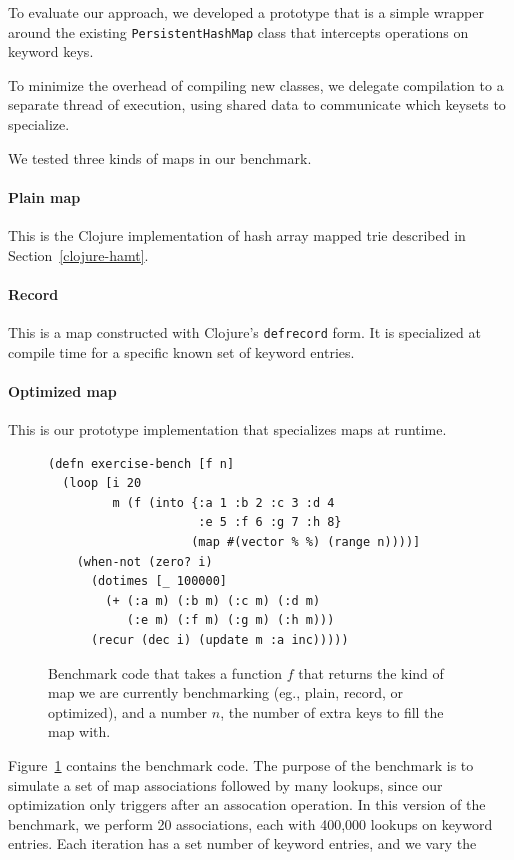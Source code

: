\documentclass[preprint]{sigplanconf}
\begin{document}
To evaluate our approach, we developed a prototype
that is a simple wrapper around the existing \texttt{PersistentHashMap}
class that intercepts operations on keyword keys.

To minimize the overhead of compiling new classes, we
delegate compilation to a separate thread of execution,
using shared data to communicate which keysets to 
specialize.

We tested three kinds of maps in our benchmark.

\paragraph{Plain map}
This is the Clojure implementation of hash array mapped trie
described in Section~\ref{clojure-hamt}.

\paragraph{Record}
This is a map constructed with Clojure's \texttt{defrecord}
form. It is specialized at compile time for a specific
known set of keyword entries.

\paragraph{Optimized map}
This is our prototype implementation that specializes
maps at runtime.

\begin{figure}
\begin{verbatim}
(defn exercise-bench [f n]
  (loop [i 20
         m (f (into {:a 1 :b 2 :c 3 :d 4
                     :e 5 :f 6 :g 7 :h 8}
                    (map #(vector % %) (range n))))]
    (when-not (zero? i)
      (dotimes [_ 100000] 
        (+ (:a m) (:b m) (:c m) (:d m)
           (:e m) (:f m) (:g m) (:h m)))
      (recur (dec i) (update m :a inc)))))
\end{verbatim}
\caption{Benchmark code that takes a function $f$
that returns the kind of map we are currently
benchmarking (eg., plain, record, or optimized),
and a number $n$, the number of extra keys to fill
the map with.
}
\label{benchmark-code}
\end{figure}

Figure~\ref{benchmark-code} contains the benchmark
code. The purpose of the benchmark is to simulate
a set of map associations followed by many lookups,
since our optimization only triggers after an assocation
operation.
In this version of the benchmark, we perform 20
associations, each with 400,000 lookups
on keyword entries.
Each iteration has a set number of keyword entries,
and we vary the 
\end{document}
